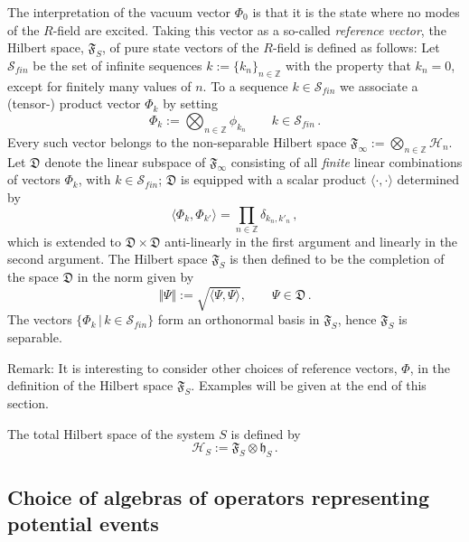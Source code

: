 \documentclass[12pt]{article}
\begin{document}
\begin{enumerate}
{The interpretation of the vacuum vector $\Phi_{{0}}$ is that it is the state where no modes of the $R$-field
are excited. Taking this vector as a so-called \textit{reference vector}, the Hilbert space, $\mathfrak{F}_{S}$,
of pure state vectors of the $R$-field is defined as follows:
Let $\mathcal{S}_{fin}$ be the set of infinite sequences
${k}:= \big\{k_n\big\}_{n\in \mathbb{Z}}$ with the property that $k_n =0$, except for finitely many values
of $n$. To a sequence ${k}\in \mathcal{S}_{fin}$ we associate a (tensor-) product vector $\Phi_{{k}}$ by setting
\begin{equation}\label{CONS}
\Phi_{{k}}:= \bigotimes_{n\in \mathbb{Z}} \phi_{k_n}\qquad {k} \in \mathcal{S}_{fin}\,.
\end{equation}
Every such vector belongs to the non-separable Hilbert space
$\mathfrak{F}_{\infty}:=\bigotimes_{n\in \mathbb{Z}} \mathcal{H}_n$. Let
$\mathfrak{D}$ denote the linear subspace of $\mathfrak{F}_{\infty}$ consisting of all \textit{finite} linear combinations of
vectors $\Phi_{{k}}$, with ${k}\in \mathcal{S}_{fin}$; $\mathfrak{D}$ is equipped with a scalar product
$\langle \cdot, \cdot \rangle$ determined by
\begin{equation}\label{scalar prod}
\langle \Phi_{{k}}, \Phi_{{k}'}\rangle = \prod_{n \in \mathbb{Z}} \delta_{k_n, k'_n}\,,
\end{equation}
which is extended to $\mathfrak{D}\times \mathfrak{D}$ anti-linearly in the first argument and linearly in the second argument.
The Hilbert space $\mathfrak{F}_{S}$ is then defined to be the completion of the space $\mathfrak{D}$ in the norm given by
$$\Vert \Psi \Vert:= \sqrt{\langle \Psi, \Psi \rangle}, \qquad \Psi \in \mathfrak{D}\,.$$
The vectors $\big\{\Phi_{{k}}\,\vert\, {k}\in \mathcal{S}_{fin}\big\}$ form an orthonormal basis in
$\mathfrak{F}_S$, hence $\mathfrak{F}_S$ is separable.

{Remark}: It is interesting to consider other choices of reference vectors, $\Phi$, in the definition of the Hilbert space
$\mathfrak{F}_S$. Examples will be given at the end of this section.

The total Hilbert space of the system $S$ is defined by
\begin{equation}
\mathcal{H}_S:= \mathfrak{F}_{S}\otimes \mathfrak{h}_S\,.
\end{equation}
}
\end{enumerate}

\subsection{Choice of algebras of operators representing potential events}
\end{document}
